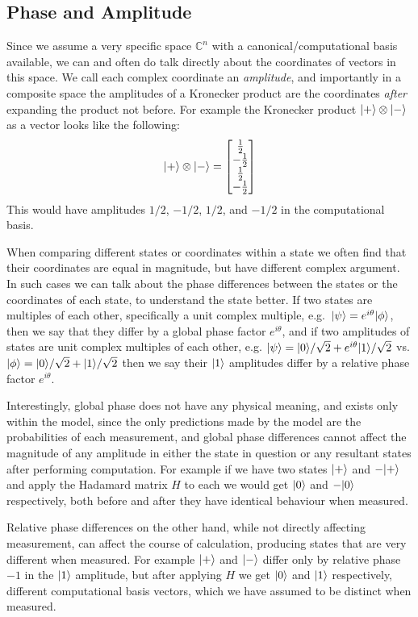 \subsection{Phase and Amplitude}
Since we assume a very specific space $\mathbb{C}^n$ with a canonical/computational basis available, we can and often do talk directly about the coordinates of vectors in this space. We call each complex coordinate an \emph{amplitude}, and importantly in a composite space the amplitudes of a Kronecker product are the coordinates \emph{after} expanding the product not before. For example the Kronecker product $| + \rangle \otimes | - \rangle$ as a vector looks like the following:
\[| + \rangle \otimes | - \rangle = \left[\begin{matrix}
\frac{1}{2} \\
-\frac{1}{2} \\
\frac{1}{2} \\
-\frac{1}{2} \\
\end{matrix}\right]\]
This would have amplitudes $1/2$, $-1/2$, $1/2$, and $-1/2$ in the computational basis.

When comparing different states or coordinates within a state we often find that their coordinates are equal in magnitude, but have different complex argument. In such cases we can talk about the phase differences between the states or the coordinates of each state, to understand the state better. If two states are multiples of each other, specifically a unit complex multiple, e.g.\ $| \psi \rangle = e^{i\theta}| \phi \rangle$, then we say that they differ by a global phase factor $e^{i\theta}$, and if two amplitudes of states are unit complex multiples of each other, e.g. $| \psi \rangle = | 0 \rangle/\sqrt{2} + e^{i\theta}| 1 \rangle/\sqrt{2}$ vs. $| \phi \rangle = | 0 \rangle/\sqrt{2} + | 1 \rangle/\sqrt{2}$ then we say their $| 1 \rangle$ amplitudes differ by a relative phase factor $e^{i\theta}$.

Interestingly, global phase does not have any physical meaning, and exists only within the model, since the only predictions made by the model are the probabilities of each measurement, and global phase differences cannot affect the magnitude of any amplitude in either the state in question or any resultant states after performing computation. For example if we have two states $| + \rangle$ and $-| + \rangle$ and apply the Hadamard matrix $H$ to each we would get $| 0 \rangle$ and $-| 0 \rangle$ respectively, both before and after they have identical behaviour when measured.

Relative phase differences on the other hand, while not directly affecting measurement, can affect the course of calculation, producing states that are very different when measured. For example $| + \rangle$ and $| - \rangle$ differ only by relative phase $-1$ in the $| 1 \rangle$ amplitude, but after applying $H$ we get $| 0 \rangle$ and $| 1 \rangle$ respectively, different computational basis vectors, which we have assumed to be distinct when measured.

